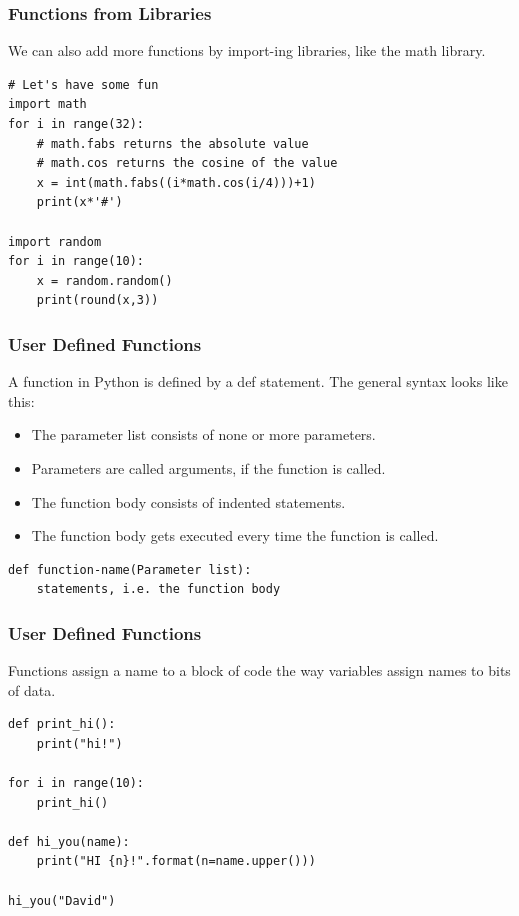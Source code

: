 \begin{frame}[fragile]\frametitle{Functions from Libraries}
We can also add more functions by import-ing libraries, like the math library. 
\begin{lstlisting}
# Let's have some fun
import math
for i in range(32):
    # math.fabs returns the absolute value
    # math.cos returns the cosine of the value
    x = int(math.fabs((i*math.cos(i/4)))+1)
    print(x*'#')
    
import random
for i in range(10):
    x = random.random()
    print(round(x,3))
\end{lstlisting}
\end{frame}


\begin{frame}[fragile]\frametitle{User Defined Functions}
A function in Python is defined by a def statement. The general syntax looks like this:
    \begin{itemize}
    \item  The parameter list consists of none or more parameters.
    \item Parameters are called arguments, if the function is called.
    \item The function body consists of indented statements.
    \item The function body gets executed every time the function is called.
    \end{itemize}
\begin{lstlisting}
def function-name(Parameter list):
    statements, i.e. the function body
\end{lstlisting}
\end{frame}




\begin{frame}[fragile]\frametitle{User Defined Functions}
Functions assign a name to a block of code the way variables assign names to bits of data.
\begin{lstlisting}
def print_hi():
    print("hi!")

for i in range(10):
    print_hi()

def hi_you(name):
    print("HI {n}!".format(n=name.upper()))

hi_you("David")
\end{lstlisting}
\end{frame}

